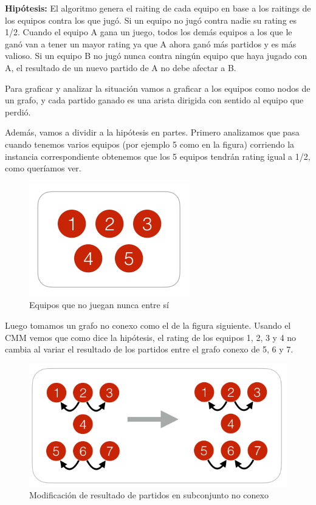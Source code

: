 \textbf{Hip\'otesis:} El algoritmo genera el raiting de cada equipo en base a los raitings de los equipos contra los que jug\'o. Si un equipo no jug\'o contra nadie su rating es 1/2. Cuando el equipo A gana un juego, todos los dem\'as equipos a los que le gan\'o van a tener un mayor rating ya que A ahora gan\'o m\'as partidos y es m\'as valioso. Si un equipo B no jug\'o nunca contra ning\'un equipo que haya jugado con A, el resultado de un nuevo partido de A no debe afectar a B.

Para graficar y analizar la situaci\'on vamos a graficar a los equipos como nodos de un grafo, y cada partido ganado es una arista dirigida con sentido al equipo que perdi\'o.

Adem\'as, vamos a dividir a la hip\'otesis en partes. Primero analizamos que pasa cuando tenemos varios equipos (por ejemplo 5 como en la figura) corriendo la instancia correspondiente obtenemos que los 5 equipos tendr\'an rating igual a 1/2, como quer\'iamos ver.

\newpage

\begin{figure}[h!]
  \begin{center}
	\includegraphics[scale=0.50]{imagenes/cualitative/fairness/fairness1.png}
	\caption{Equipos que no juegan nunca entre s\'i}
  \end{center}
\end{figure}

Luego tomamos un grafo no conexo como el de la figura siguiente. Usando el CMM vemos que como dice la hip\'otesis, el rating de los equipos 1, 2, 3 y 4 no cambia al variar el resultado de los partidos entre el grafo conexo de 5, 6 y 7.

\begin{figure}[h!]
  \begin{center}
	\includegraphics[scale=0.50]{imagenes/cualitative/fairness/fairness2.png}
	\caption{Modificaci\'on de resultado de partidos en subconjunto no conexo}
  \end{center}
\end{figure}

